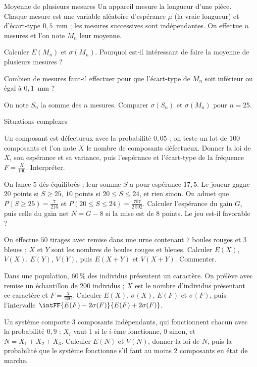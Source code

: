 \begin{exercice}[2]{Moyenne de plusieurs mesures}
Un appareil mesure la longueur d'une pièce. Chaque mesure est une variable aléatoire d'espérance $\mu$ (la vraie longueur) et
d'écart-type $0{,}5$~mm ; les mesures successives sont indépendantes. On effectue $n$ mesures et l'on note $M_n$ leur moyenne.
\begin{questions}
  \item Calculer $E(M_n)$ et $\sigma(M_n)$. Pourquoi est-il intéressant de faire la moyenne de plusieurs mesures ?
  \item Combien de mesures faut-il effectuer pour que l'écart-type de $M_n$ soit inférieur ou égal à $0{,}1$~mm ?
  \item On note $S_n$ la somme des $n$ mesures. Comparer $\sigma(S_n)$ et $\sigma(M_n)$ pour $n=25$.
\end{questions}
\end{exercice}


\begin{exercice}[3]{Situations complexes}
\begin{questions}
  \item Un composant est défectueux avec la probabilité $0{,}05$ ; on teste un lot de $100$ composants et l'on note $X$ le nombre de
    composants défectueux. Donner la loi de $X$, son espérance et sa variance, puis l'espérance et l'écart-type de la fréquence
    $F=\frac{X}{100}$. Interpréter.
  \item On lance $5$ dés équilibrés ; leur somme $S$ a pour espérance $17{,}5$. Le joueur gagne $20$ points si $S\geq25$, $10$ points
    si $20\leq S\leq24$, et rien sinon. On admet que $P(S\geq25)=\frac{7}{216}$ et $P(20\leq S\leq24)=\frac{707}{2\,592}$. Calculer
    l'espérance du gain $G$, puis celle du gain net $N=G-8$ si la mise est de $8$ points. Le jeu est-il favorable ?
  \item On effectue $50$ tirages avec remise dans une urne contenant $7$ boules rouges et $3$ bleues ; $X$ et $Y$ sont les nombres de
    boules rouges et bleues. Calculer $E(X)$, $V(X)$, $E(Y)$, $V(Y)$, puis $E(X+Y)$ et $V(X+Y)$. Commenter.
  \item Dans une population, 60\,\% des individus présentent un caractère. On prélève avec remise un échantillon de $200$ individus ;
    $X$ est le nombre d'individus présentant ce caractère et $F=\frac{X}{200}$. Calculer $E(X)$, $\sigma(X)$, $E(F)$ et $\sigma(F)$,
    puis l'intervalle $\intFF{E(F)-2\sigma(F)}{E(F)+2\sigma(F)}$.
  \item Un système comporte $3$ composants indépendants, qui fonctionnent chacun avec la probabilité $0{,}9$ ; $X_i$ vaut $1$ si le
    $i$-ème fonctionne, $0$ sinon, et $N=X_1+X_2+X_3$. Calculer $E(N)$ et $V(N)$, donner la loi de $N$, puis la probabilité que le
    système fonctionne s'il faut au moins $2$ composants en état de marche.
\end{questions}
\end{exercice}

